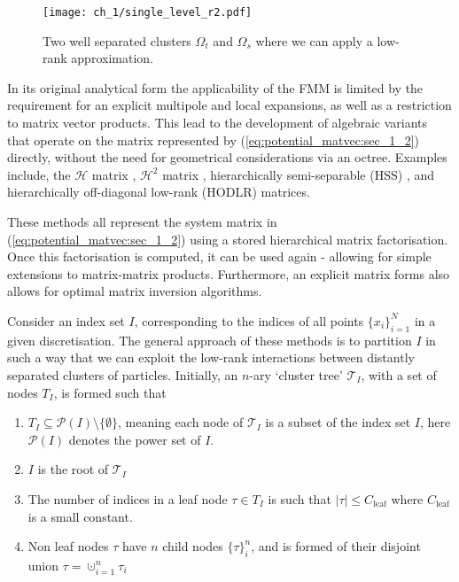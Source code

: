 \begin{figure}
    \centering
    \texttt{[image: ch\_1/single\_level\_r2.pdf]}
    \caption{Two well separated clusters $\Omega_t$ and $\Omega_s$ where we can apply a low-rank approximation.}
    \label{fig:single_level_r2:sec_1_2}
\end{figure}

In its original analytical form the applicability of the FMM is limited by the requirement for an explicit multipole and local expansions, as well as a restriction to matrix vector products. This lead to the development of algebraic variants that operate on the matrix represented by (\ref{eq:potential_matvec:sec_1_2}) directly, without the need for geometrical considerations via an octree. Examples include, the $\mathcal{H}$ matrix \cite{hackbusch1999sparse}, $\mathcal{H}^2$ matrix \cite{borm2003short}, hierarchically semi-separable (HSS) \cite{chandrasekaran2007fast}, and hierarchically off-diagonal low-rank (HODLR) \cite{ambikasaran2013mathcal} matrices.

These methods all represent the system matrix in (\ref{eq:potential_matvec:sec_1_2}) using a stored hierarchical matrix factorisation. Once this factorisation is computed, it can be used again - allowing for simple extensions to matrix-matrix products. Furthermore, an explicit matrix forms also allows for optimal matrix inversion algorithms.

Consider an index set $I$, corresponding to the indices of all points $\{ x_i \}_{i=1}^N$ in a given discretisation. The general approach of these methods is to partition $I$ in such a way that we can exploit the low-rank interactions between distantly separated clusters of particles. Initially, an $n$-ary `cluster tree' $\mathcal{T}_I$, with a set of nodes $T_I$, is formed such that

\begin{enumerate}
    \item $T_I \subseteq \mathcal{P}(I) \setminus \{ \emptyset \}$, meaning each node  of $\mathcal{T}_I$ is a subset of the index set $I$, here $\mathcal{P}(I)$ denotes the power set of $I$.
    \item $I$ is the root of $\mathcal{T}_I$
    \item The number of indices in a leaf node $\tau \in T_I$ is such that $|\tau| \leq C_{\text{leaf}}$ where $C_{\text{leaf}}$ is a small constant.
    \item Non leaf nodes $\tau$ have $n$ child nodes $\{ \tau \}_i^n$, and is formed of their disjoint union $\tau = \cupdot_{i=1}^n \tau_i$ 
\end{enumerate}

